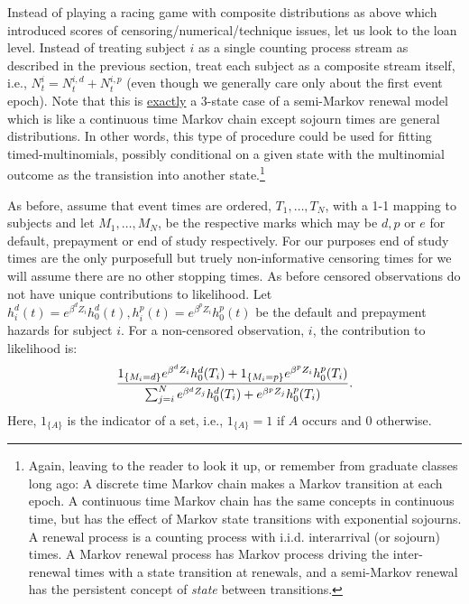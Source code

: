 \documentclass[10pt]{article}
\begin{document}
Instead of playing a racing game with composite distributions as above which introduced scores of censoring/numerical/technique issues, let us 
look to the loan level.  Instead of treating subject $i$ as a single counting process stream as described in the previous section, treat each subject as a 
composite stream itself, i.e., $N^i_t=N^{i,d}_t+N^{i,p}_t$ (even though we generally care only about the first event epoch).
Note that 
this is \underline{exactly} a 3-state case of a semi-Markov renewal model which is like a continuous 
time Markov chain except sojourn times are general distributions.  In other words, this type of procedure could be used for fitting timed-multinomials, 
possibly conditional on a given state with the multinomial outcome as the transistion into another state.\footnote{Again, leaving to the
reader to look it up, or remember from graduate classes long ago:   A discrete time Markov chain makes a Markov transition at each epoch. A
continuous time Markov chain has the same concepts in continuous time, but has the effect of Markov state transitions with exponential
sojourns.  A renewal process is a counting process with i.i.d. interarrival (or sojourn) times.  A Markov renewal process has Markov process
driving the inter-renewal times with a state transition at renewals, and a semi-Markov renewal has the persistent concept of {\em state}
between transitions.}

As before, assume that event times are ordered, $T_1, \ldots, T_N$, with a 1-1 mapping to subjects and let $M_1, \ldots, M_N$, be the respective marks which 
may be $d, p$ or $e$ for default, prepayment or end of study respectively.  For our purposes end of study times are the only purposefull but truely non-informative 
censoring times for we will assume there are no other stopping times.  As before censored observations do not have unique contributions to likelihood.  Let 
$h^d_i(t)=e^{\beta^d Z_i}h^d_0(t), h^p_i(t)=e^{\beta^p Z_i}h^p_0(t)$ be the default and prepayment hazards for subject $i$.
For a non-censored observation, $i$, the contribution to likelihood is:
$$ {{1_{\{M_i=d\}}e^{\beta^d Z_i}h^d_0(T_i)+1_{\{M_i=p\}}e^{\beta^p Z_i}h^p_0(T_i) } 
\over { \sum_{j=i}^N e^{\beta^d Z_j}h^d_0(T_i)+e^{\beta^p Z_j}h^p_0(T_i) } }.$$
Here, $1_{\{A\}}$ is the indicator of a set, i.e., $1_{\{A\}}=1$ if $A$ occurs and 0 otherwise.
\end{document}
